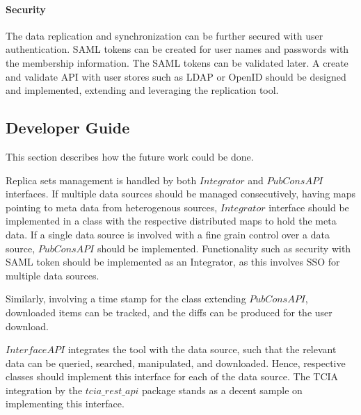 \documentclass[conference]{IEEEtran}
\begin{document}
\paragraph*{Security}
The data replication and synchronization can be further secured with user authentication. SAML tokens can be created for user names and passwords with the membership information. The SAML tokens can be validated later. A create and validate API with user stores such as LDAP or OpenID should be designed and implemented, extending and leveraging the replication tool.

\subsection{Developer Guide}
This section describes how the future work could be done.

Replica sets management is handled by both $Integrator$ and $PubConsAPI$ interfaces. If multiple data sources should be managed consecutively, having maps pointing to meta data from heterogenous sources, $Integrator$ interface should be implemented in a class with the respective distributed maps to hold the meta data. If a single data source is involved with a fine grain control over a data source, $PubConsAPI$ should be implemented. Functionality such as security with SAML token should be implemented as an Integrator, as this involves SSO for multiple data sources.

Similarly, involving a time stamp for the class extending $PubConsAPI$, downloaded items can be tracked, and the diffs can be produced for the user download.

$InterfaceAPI$ integrates the tool with the data source, such that the relevant data can be queried, searched, manipulated, and downloaded. Hence, respective classes should implement this interface for each of the data source. The TCIA integration by the $tcia\_rest\_api$ package stands as a decent sample on implementing this interface.

\end{document}
